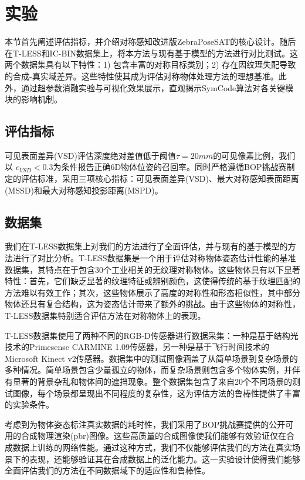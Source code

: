 \section{实验}

本节首先阐述评估指标，并介绍对称感知改进版ZebraPoseSAT\cite{su2022zebrapose}的核心设计。随后在T-LESS\cite{tless}和IC-BIN\cite{icbin}数据集上，将本方法与现有基于模型的方法进行对比测试。这两个数据集具有以下特性：1) 包含丰富的对称目标类别；2) 存在因纹理失配导致的合成-真实域差异。这些特性使其成为评估对称物体处理方法的理想基准。此外，通过超参数消融实验与可视化效果展示，直观揭示SymCode算法对各关键模块的影响机制。

\subsection{评估指标}

可见表面差异(VSD)评估深度绝对差值低于阈值$\tau=20mm$的可见像素比例，我们以 $e_{VSD}<0.3$\cite{pitteri2019object}为条件报告正确6D物体位姿的召回率。同时严格遵循BOP挑战赛\cite{hodan2024bop}制定的评估标准，采用三项核心指标：可见表面差异(VSD)、最大对称感知表面距离(MSSD)和最大对称感知投影距离(MSPD)。

\subsection{数据集}

\par 我们在T-LESS数据集\cite{tless}上对我们的方法进行了全面评估，并与现有的基于模型的方法进行了对比分析。T-LESS数据集是一个用于评估对称物体姿态估计性能的基准数据集，其特点在于包含30个工业相关的无纹理对称物体。这些物体具有以下显著特性：首先，它们缺乏显著的纹理特征或辨别颜色，这使得传统的基于纹理匹配的方法难以有效工作；其次，这些物体展示了高度的对称性和形态相似性，其中部分物体还具有复合结构，这为姿态估计带来了额外的挑战。由于这些物体的对称性，T-LESS数据集特别适合评估方法在对称物体上的表现。
\par T-LESS数据集使用了两种不同的RGB-D传感器进行数据采集：一种是基于结构光技术的Primesense CARMINE 1.09传感器，另一种是基于飞行时间技术的Microsoft Kinect v2传感器。数据集中的测试图像涵盖了从简单场景到复杂场景的多种情况。简单场景包含少量孤立的物体，而复杂场景则包含多个物体实例，并伴有显著的背景杂乱和物体间的遮挡现象。整个数据集包含了来自20个不同场景的测试图像，每个场景都呈现出不同程度的复杂性，这为评估方法的鲁棒性提供了丰富的实验条件。
\par 考虑到为物体姿态标注真实数据的耗时性，我们采用了BOP挑战赛\cite{hodan2018bop}提供的公开可用的合成物理渲染(pbr)图像。这些高质量的合成图像使我们能够有效验证仅在合成数据上训练的网络性能。通过这种方式，我们不仅能够评估我们的方法在真实场景下的表现，还能够验证其在合成数据上的泛化能力。这一实验设计使得我们能够全面评估我们的方法在不同数据域下的适应性和鲁棒性。

